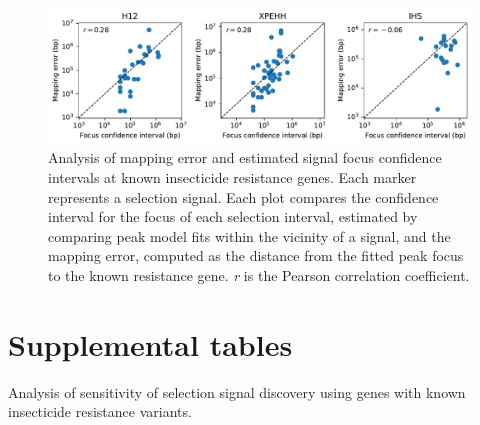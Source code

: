 \documentclass[a4paper,11pt,abstracton,hidelinks]{scrartcl}
\begin{document}
\clearpage
\begin{figure}[h!]
\centering
\includegraphics[width=1.1\textwidth,center]{artwork/chapter5/accuracy.pdf}
\caption{Analysis of mapping error and estimated signal focus confidence intervals at known insecticide resistance genes.
%
Each marker represents a selection signal.
%
Each plot compares the confidence interval for the focus of each selection interval, estimated by comparing peak model fits within the vicinity of a signal, and the mapping error, computed as the distance from the fitted peak focus to the known resistance gene.
%
\textit{r} is the Pearson correlation coefficient.
}
\label{fig:accuracy}
\end{figure}


\clearpage
\section{Supplemental tables}\label{sec:supplemental-tables}


\begin{table}[h]
\begin{center}
\begin{threeparttable}
%
\caption{Analysis of sensitivity of selection signal discovery using genes with known insecticide resistance variants.}
%
\label{table:sens}
%

%
\end{threeparttable}
\end{center}
\end{table}


\clearpage
\begin{table}[h]
\begin{center}
\begin{threeparttable}

\caption{Analysis of mapping error using selection signals at known insecticide resistance genes.
%
$N$ = no. of selection signals found overlapping the gene.
%
$ME_n$ = $n^{th}$ percentile of mapping error (distance from signal center to gene) in all selection signals spanning the gene.
%
Within CI = percentage of signals where the gene was within the estimated focus confidence interval.
}

\label{table:acc}



\end{threeparttable}
\end{center}
\end{table}
\end{document}
